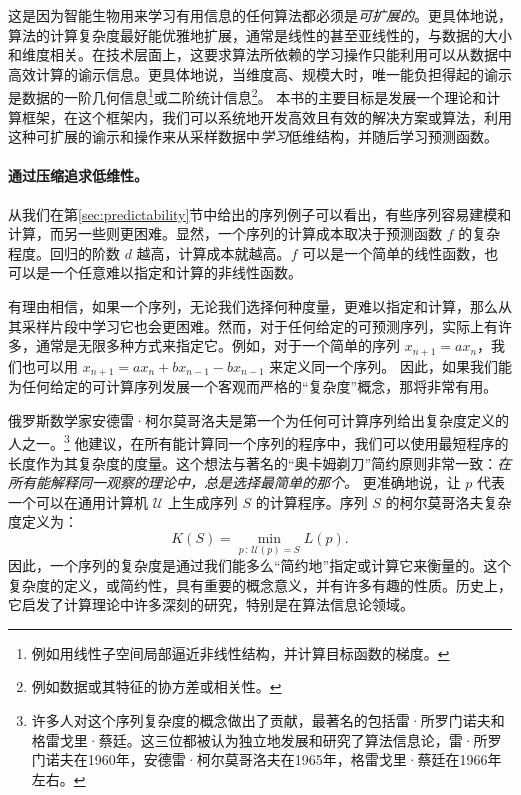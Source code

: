 \documentclass[../../book-main.tex]{subfiles}
\begin{document}
这是因为智能生物用来学习有用信息的任何算法都必须是{\em 可扩展的}。更具体地说，算法的计算复杂度最好能优雅地扩展，通常是线性的甚至亚线性的，与数据的大小和维度相关。在技术层面上，这要求算法所依赖的学习操作只能利用可以从数据中高效计算的谕示信息。更具体地说，当维度高、规模大时，唯一能负担得起的谕示是数据的一阶几何信息\footnote{例如用线性子空间局部逼近非线性结构，并计算目标函数的梯度。}或二阶统计信息\footnote{例如数据或其特征的协方差或相关性。}。
本书的主要目标是发展一个理论和计算框架，在这个框架内，我们可以系统地开发高效且有效的解决方案或算法，利用这种可扩展的谕示和操作来从采样数据中{\em 学习}低维结构，并随后学习预测函数。


\paragraph{通过压缩追求低维性。}
从我们在第\ref{sec:predictability}节中给出的序列例子可以看出，有些序列容易建模和计算，而另一些则更困难。显然，一个序列的计算成本取决于预测函数 $f$ 的复杂程度。回归的阶数 $d$ 越高，计算成本就越高。$f$ 可以是一个简单的线性函数，也可以是一个任意难以指定和计算的非线性函数。

有理由相信，如果一个序列，无论我们选择何种度量，更难以指定和计算，那么从其采样片段中学习它也会更困难。然而，对于任何给定的可预测序列，实际上有许多，通常是无限多种方式来指定它。例如，对于一个简单的序列 $x_{n+1} = a x_{n}$，我们也可以用 $x_{n+1} = a x_n + b x_{n-1} - b x_{n-1}$ 来定义同一个序列。
因此，如果我们能为任何给定的可计算序列发展一个客观而严格的“复杂度”概念，那将非常有用。

俄罗斯数学家安德雷·柯尔莫哥洛夫是第一个为任何可计算序列给出复杂度定义的人之一。\footnote{许多人对这个序列复杂度的概念做出了贡献，最著名的包括雷·所罗门诺夫和格雷戈里·蔡廷。这三位都被认为独立地发展和研究了算法信息论，雷·所罗门诺夫在1960年，安德雷·柯尔莫哥洛夫在1965年\cite{Kolmogorov1998OnTO}，格雷戈里·蔡廷在1966年左右\cite{Chaitin-1966}。} 他建议，在所有能计算同一个序列的程序中，我们可以使用最短程序的长度作为其复杂度的度量。这个想法与著名的“奥卡姆剃刀”简约原则非常一致：{\em 在所有能解释同一观察的理论中，总是选择最简单的那个。} 更准确地说，让 $p$ 代表一个可以在通用计算机 $\mathcal{U}$ 上生成序列 $S$ 的计算程序。序列 $S$ 的柯尔莫哥洛夫复杂度定义为：
\begin{equation}
    K(S) = \min_{p\,:\, \mathcal{U}(p) = S} L(p). 
\end{equation}
因此，一个序列的复杂度是通过我们能多么“简约地”指定或计算它来衡量的。这个复杂度的定义，或简约性，具有重要的概念意义，并有许多有趣的性质。历史上，它启发了计算理论中许多深刻的研究，特别是在算法信息论领域。
\end{document}

